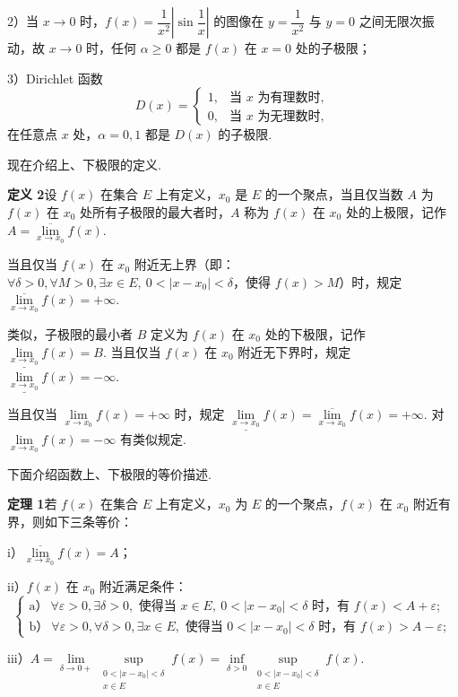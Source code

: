 \documentclass[UTF8,12pt,a4paper,fontset=fandol]{ctexart}
\begin{document}
2）当 $x\to0$ 时，$f(x)=\dfrac1{x^2}\left|\sin\dfrac1x\right|$ 的图像在 $y=\dfrac1{x^2}$ 与 $y=0$ 之间无限次振动，故 $x\to0$ 时，任何 $\alpha\ge0$ 都是 $f(x)$ 在 $x=0$ 处的子极限；

3）Dirichlet 函数
\[
  D(x)=
  \begin{cases}
    1, & \text{当 }x\text{ 为有理数时},\\
    0, & \text{当 }x\text{ 为无理数时},
  \end{cases}
\]
在任意点 $x$ 处，$\alpha=0,1$ 都是 $D(x)$ 的子极限.

现在介绍上、下极限的定义.

\noindent\textbf{定义 2}\quad 设 $f(x)$ 在集合 $E$ 上有定义，$x_0$ 是 $E$ 的一个聚点，当且仅当数 $A$ 为 $f(x)$ 在 $x_0$ 处所有子极限的最大者时，$A$ 称为 $f(x)$ 在 $x_0$ 处的上极限，记作 $A=\overline{\lim\limits_{x\to x_0}}f(x)$.

当且仅当 $f(x)$ 在 $x_0$ 附近无上界（即：$\forall \delta>0,\forall M>0,\exists x\in E,\ 0<|x-x_0|<\delta$，使得 $f(x)>M$）时，规定 $\overline{\lim\limits_{x\to x_0}}f(x)=+\infty$.

类似，子极限的最小者 $B$ 定义为 $f(x)$ 在 $x_0$ 处的下极限，记作 $\underline{\lim\limits_{x\to x_0}}f(x)=B$. 当且仅当 $f(x)$ 在 $x_0$ 附近无下界时，规定 $\underline{\lim\limits_{x\to x_0}}f(x)=-\infty$.

当且仅当 $\lim\limits_{x\to x_0}f(x)=+\infty$ 时，规定 $\underline{\lim\limits_{x\to x_0}}f(x)=\overline{\lim\limits_{x\to x_0}}f(x)=+\infty$. 对 $\lim\limits_{x\to x_0}f(x)=-\infty$ 有类似规定.

下面介绍函数上、下极限的等价描述.

\noindent\textbf{定理 1}\quad 若 $f(x)$ 在集合 $E$ 上有定义，$x_0$ 为 $E$ 的一个聚点，$f(x)$ 在 $x_0$ 附近有界，则如下三条等价：

i）$\overline{\lim\limits_{x\to x_0}}f(x)=A$；

ii）$f(x)$ 在 $x_0$ 附近满足条件：
\[
\begin{cases}
\text{a）}\ \forall \varepsilon>0,\exists\delta>0,\text{ 使得当 }x\in E,\ 0<|x-x_0|<\delta\text{ 时，有 }f(x)<A+\varepsilon;\\
\text{b）}\ \forall \varepsilon>0,\forall\delta>0,\exists x\in E,\text{ 使得当 }0<|x-x_0|<\delta\text{ 时，有 }f(x)>A-\varepsilon;
\end{cases}
\]

iii）$A=\lim\limits_{\delta\to0+}\sup\limits_{\substack{0<|x-x_0|<\delta\\ x\in E}}f(x)
=\inf\limits_{\delta>0}\sup\limits_{\substack{0<|x-x_0|<\delta\\ x\in E}}f(x)$.
\end{document}
